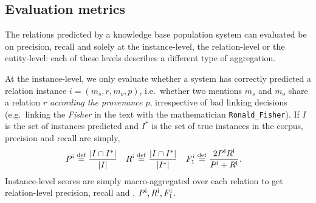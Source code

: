 \subsection{Evaluation metrics}

The relations predicted by a knowledge base population system can evaluated be on precision, recall and \fone{} solely at the instance-level, the relation-level or the entity-level: each of these levels describes a different type of aggregation.

At the instance-level, we only evaluate whether a system has correctly predicted a relation instance $i = (m_s, r, m_o, p)$, i.e.\ whether two mentions $m_s$ and $m_o$ share a relation $r$ \textit{according the provenance $p$}, irrespective of bad linking decisions (e.g.\ linking the \textit{Fisher} in the text with the mathematician \texttt{Ronald\_Fisher}).
If $I$ is the set of instances predicted and $I^*$ is the set of true instances in the corpus, precision and recall are simply,
\begin{align*}
  P^\text{i} &\eqdef \frac{|I \intersection I^*|}{|I|} & %
  R^\text{i} &\eqdef \frac{|I \intersection I^*|}{|I^*|} &
  \fone^\text{i} &\eqdef \frac{2 P^\text{i} R^\text{i}}{P^\text{i} + R^\text{i}}.
\end{align*}
Instance-level scores are simply macro-aggregated over each relation to get relation-level precision, recall and \fone{}, $P^\text{i}, R^\text{i}, F_1^\text{i}$.

